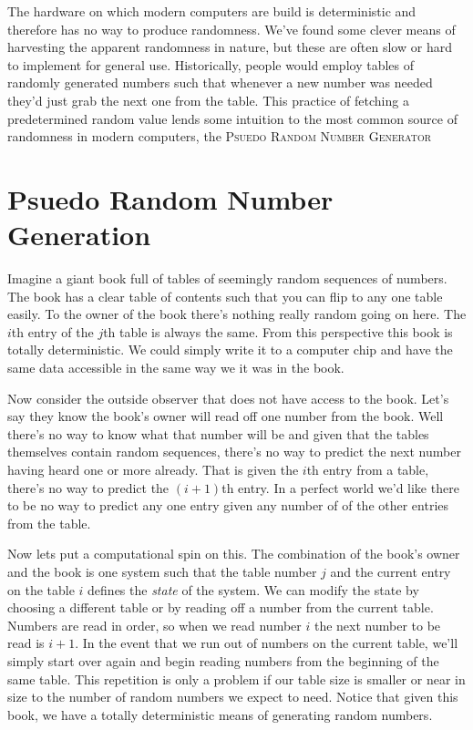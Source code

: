 \documentclass[]{tufte-handout}
\begin{document}
The hardware on which modern computers are build is deterministic and therefore has no way to produce randomness. We've found some clever means of harvesting the apparent randomness in nature, but these are often slow or hard to implement for general use. Historically, people would employ tables of randomly generated numbers such that whenever a new number was needed they'd just grab the next one from the table. This practice of fetching a predetermined random value lends some intuition to the most common source of randomness in modern computers, the \textsc{Psuedo Random Number Generator}


\section{Psuedo Random Number Generation}

Imagine a giant book full of tables of seemingly random sequences of numbers. The book has a clear table of contents such that you can flip to any one table easily. To the owner of the book there's nothing really random going on here. The $i$th entry of the $j$th table is always the same.  From this perspective this book is totally deterministic. We could simply write it to a computer chip and have the same data accessible in the same way we it was in the book.

Now consider the outside observer that does not have access to the book. Let's say they know the book's owner will read off one number from the book. Well there's no way to know what that number will be and given that the tables themselves contain random sequences, there's no way to predict the next number having heard one or more already. That is given the $i$th entry from a table, there's no way to predict the $(i+1)$th entry.  In a perfect world we'd like there to be no way to predict any one entry given any number of of the other entries from the table.

Now lets put a computational spin on this. The combination of the book's owner and the book is one system such that the table number $j$ and the current entry on the table $i$ defines the \textit{state} of the system. We can modify the state by choosing a different table or by reading off a number from the current table. Numbers are read in order, so when we read number $i$ the next number to be read is $i+1$. In the event that we run out of numbers on the current table, we'll simply start over again and begin reading numbers from the beginning of the same table. This repetition is only a problem if our table size is smaller or near in size to the number of random numbers we expect to need. Notice that given this book, we have a totally deterministic means of generating random numbers.
\end{document}
